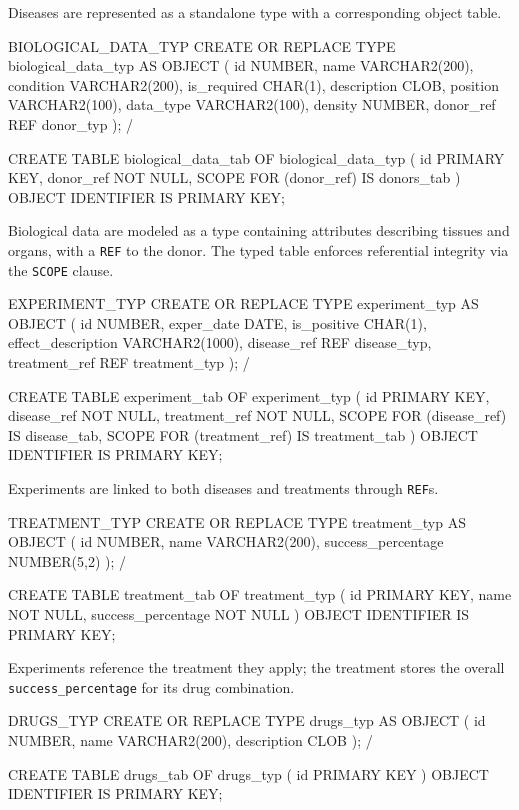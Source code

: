 \documentclass[11pt,a4paper]{article}
\begin{document}
Diseases are represented as a standalone type with a corresponding object table.

\begin{sqlbox}{BIOLOGICAL\_DATA\_TYP}
CREATE OR REPLACE TYPE biological_data_typ AS OBJECT (
  id            NUMBER,
  name          VARCHAR2(200),
  condition     VARCHAR2(200),
  is_required   CHAR(1),
  description   CLOB,
  position      VARCHAR2(100),
  data_type     VARCHAR2(100),
  density       NUMBER,
  donor_ref     REF donor_typ
);
/

CREATE TABLE biological_data_tab OF biological_data_typ (
  id PRIMARY KEY,
  donor_ref NOT NULL,
  SCOPE FOR (donor_ref) IS donors_tab
) OBJECT IDENTIFIER IS PRIMARY KEY;
\end{sqlbox}

Biological data are modeled as a type containing attributes describing tissues and organs, with a \texttt{REF} to the donor. The typed table enforces referential integrity via the \texttt{SCOPE} clause.

\begin{sqlbox}{EXPERIMENT\_TYP}
CREATE OR REPLACE TYPE experiment_typ AS OBJECT (
  id                   NUMBER,
  exper_date           DATE,
  is_positive          CHAR(1),
  effect_description   VARCHAR2(1000),
  disease_ref          REF disease_typ,
  treatment_ref        REF treatment_typ
);
/

CREATE TABLE experiment_tab OF experiment_typ (
  id PRIMARY KEY,
  disease_ref NOT NULL,
  treatment_ref NOT NULL,
  SCOPE FOR (disease_ref) IS disease_tab,
  SCOPE FOR (treatment_ref) IS treatment_tab
) OBJECT IDENTIFIER IS PRIMARY KEY;
\end{sqlbox}

Experiments are linked to both diseases and treatments through \texttt{REF}s.

\begin{sqlbox}{TREATMENT\_TYP}
CREATE OR REPLACE TYPE treatment_typ AS OBJECT (
  id                  NUMBER,
  name                VARCHAR2(200),
  success_percentage  NUMBER(5,2)
);
/

CREATE TABLE treatment_tab OF treatment_typ (
  id PRIMARY KEY,
  name NOT NULL,
  success_percentage NOT NULL
) OBJECT IDENTIFIER IS PRIMARY KEY;
\end{sqlbox}

Experiments reference the treatment they apply; the treatment stores the overall \texttt{success\_percentage} for its drug combination.

\begin{sqlbox}{DRUGS\_TYP}
CREATE OR REPLACE TYPE drugs_typ AS OBJECT (
  id          NUMBER,
  name        VARCHAR2(200),
  description CLOB
);
/

CREATE TABLE drugs_tab OF drugs_typ (
  id PRIMARY KEY
) OBJECT IDENTIFIER IS PRIMARY KEY;
\end{sqlbox}
\end{document}
